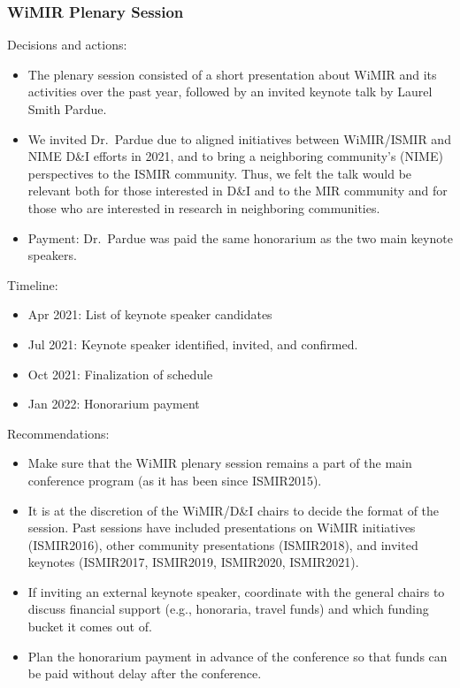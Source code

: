 \documentclass[%
10pt,								%
titlepage,						%
]
{scrartcl}
\begin{document}
        \subsubsection{WiMIR Plenary Session}\label{sec:di_plenary}
            Decisions and actions:
            \begin{itemize}
                \item   The plenary session consisted of a short presentation about WiMIR and its activities over the past year, followed by an invited keynote talk by Laurel Smith Pardue.
                \item   We invited Dr.\ Pardue due to aligned initiatives between WiMIR/ISMIR and NIME D\&I efforts in 2021, and to bring a neighboring community's (NIME) perspectives to the ISMIR community. Thus, we felt the talk would be relevant both for those interested in D\&I and to the MIR community and for those who are interested in research in neighboring communities.
                \item   Payment: Dr.\ Pardue was paid the same honorarium as the two main keynote speakers.
            \end{itemize}

            Timeline:
            \begin{itemize}
                \item   Apr 2021: List of keynote speaker candidates
                \item   Jul 2021: Keynote speaker identified, invited, and confirmed.
                \item   Oct 2021: Finalization of schedule
                \item   Jan 2022: Honorarium payment 
            \end{itemize}

            Recommendations:
            \begin{itemize}
                \item   Make sure that the WiMIR plenary session remains a part of the main conference program (as it has been since ISMIR2015). 
                \item   It is at the discretion of the WiMIR/D\&I chairs to decide the format of the session. Past sessions have included presentations on WiMIR initiatives (ISMIR2016), other community presentations (ISMIR2018), and invited keynotes (ISMIR2017, ISMIR2019, ISMIR2020, ISMIR2021). 
                \item   If inviting an external keynote speaker, coordinate with the general chairs to discuss financial support (e.g., honoraria, travel funds) and which funding bucket it comes out of.
                \item   Plan the honorarium payment in advance of the conference so that funds can be paid without delay after the conference.
            \end{itemize}
\end{document}
